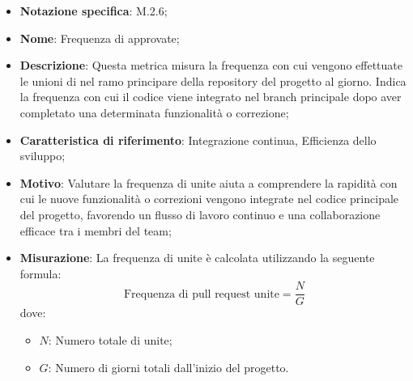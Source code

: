 \begin{itemize}
    \item \textbf{Notazione specifica}: M.2.6;
    \item \textbf{Nome}: Frequenza di  approvate;
    \item \textbf{Descrizione}: Questa metrica misura la frequenza con cui vengono effettuate le unioni di  nel ramo principare della repository del progetto al giorno. Indica la frequenza con cui il codice viene integrato nel branch principale dopo aver completato una determinata funzionalità o correzione;
    \item \textbf{Caratteristica di riferimento}: Integrazione continua, Efficienza dello sviluppo;
    \item \textbf{Motivo}: Valutare la frequenza di  unite aiuta a comprendere la rapidità con cui le nuove funzionalità o correzioni vengono integrate nel codice principale del progetto, favorendo un flusso di lavoro continuo e una collaborazione efficace tra i membri del team;
    \item \textbf{Misurazione}: La frequenza di  unite è calcolata utilizzando la seguente formula:
    \[
        \text{Frequenza di pull request unite} =\frac{N}{G} 
    \]
    dove:
    \begin{itemize}
        \item $N$: Numero totale di  unite;
        \item $G$: Numero di giorni totali dall'inizio del progetto.
    \end{itemize}
   
\end{itemize}
